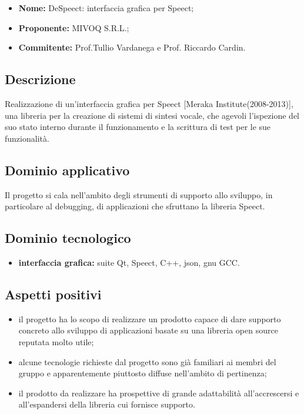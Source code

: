 \documentclass[openany,12pt,a4paper]{report}
\begin{document}
\begin{itemize}
    \item \textbf{Nome:} DeSpeect: interfaccia grafica per Speect;
    \item \textbf{Proponente:} MIVOQ S.R.L.;
    \item \textbf{Commitente:} Prof.Tullio Vardanega e Prof. Riccardo Cardin.
\end{itemize}

\subsection{Descrizione}

Realizzazione di un’interfaccia grafica per Speect [Meraka Institute(2008-2013)], una libreria per la creazione di sistemi di sintesi vocale, che agevoli l’ispezione del suo stato interno durante il funzionamento e la scrittura di test per le sue funzionalità.


\subsection{Dominio applicativo}

Il progetto si cala nell'ambito degli strumenti di supporto allo sviluppo, in particolare al debugging, di applicazioni che sfruttano la libreria Speect.

\subsection{Dominio tecnologico}

\begin{itemize}
    \item \textbf{interfaccia grafica:} suite Qt, Speect, C++, json, gnu GCC.
\end{itemize}

\subsection{Aspetti positivi}

\begin{itemize}
    \item il progetto ha lo scopo di realizzare un prodotto capace di dare supporto concreto allo sviluppo di applicazioni basate su una libreria open source reputata molto utile;
    
    \item alcune tecnologie richieste dal progetto sono già familiari ai membri del gruppo e apparentemente piuttosto diffuse nell'ambito di pertinenza;
    
    \item il prodotto da realizzare ha prospettive di grande adattabilità all'accrescersi e all'espandersi della libreria cui fornisce supporto.
\end{itemize}
\end{document}
